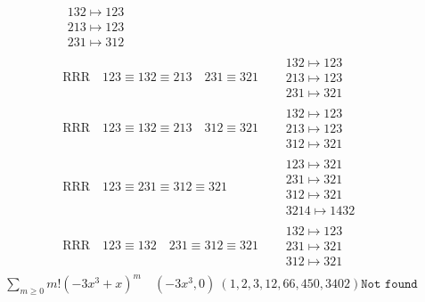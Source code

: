 \documentclass{article}
\begin{document}
\begin{align}
\begin{matrix}
132 \mapsto 123
\\
213 \mapsto 123
\\
231 \mapsto 312
\end{matrix}
\\
\text{RRR}
\quad
123\equiv132\equiv213
\quad
231\equiv321
\quad
&
\begin{matrix}
132 \mapsto 123
\\
213 \mapsto 123
\\
231 \mapsto 321
\end{matrix}
\\
\text{RRR}
\quad
123\equiv132\equiv213
\quad
312\equiv321
\quad
&
\begin{matrix}
132 \mapsto 123
\\
213 \mapsto 123
\\
312 \mapsto 321
\end{matrix}
\\
\text{RRR}
\quad
123\equiv231\equiv312\equiv321
\quad
&
\begin{matrix}
123 \mapsto 321
\\
231 \mapsto 321
\\
312 \mapsto 321
\\
3214 \mapsto 1432
\end{matrix}
\\
\text{RRR}
\quad
123\equiv132
\quad
231\equiv312\equiv321
\quad
&
\begin{matrix}
132 \mapsto 123
\\
231 \mapsto 321
\\
312 \mapsto 321
\end{matrix}
\end{align}
$$
\begin{matrix}
\sum_{m \geq 0} m! \left(
-3 x^{3} + x
\right)^m
\quad
\left(-3 x^{3}, 0\right)
\ 
\left(1, 2, 3, 12, 66, 450, 3402\right)
\texttt{
Not found
}
\end{matrix}
$$
\end{document}
